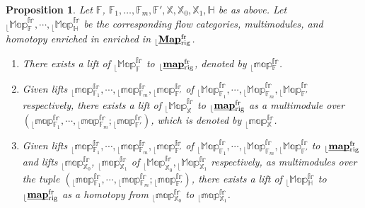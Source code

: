 \documentclass[reqno, 10pt]{amsart}
\numberwithin{equation}{section}
\numberwithin{equation}{section}
\newtheorem{prop}[thm]{Proposition}
\theoremstyle{definition}
\theoremstyle{remark}
\newcommand{\mb}{\mathbb}
\renewcommand{\outer}{{}_{\lfloor}}
\newcommand{\uds}[1]{\underline{\smash{#1}}}
\begin{document}
\begin{prop}\label{prop_group_reduction}
Let ${\mb F}$, ${\mb F}_1, \ldots, {\mb F}_m, {\mb F}', {\mb X}, {\mb X}_0, {\mb X}_1, {\mb H}$ be as above. Let $\outer \mb{Map}_{\mb F}^{\mb{fr}}, \cdots, \outer \mb{Map}_{{\mb H}}^{\mb{fr}}$ be the corresponding flow categories, multimodules, and homotopy enriched in enriched in $\outer \uds{\bf Map}^{\rm fr}_{\rm rig}$.
\begin{enumerate}

\item There exists a lift of $\outer \mb{Map}_{\mb F}^{\mb{fr}}$ to $\outer \uds{\bf map}^{\rm fr}_{\rm rig}$, denoted by $\outer \mb{map}{}_{\mb{F}}^{\mb{fr}}$.

\item Given lifts $\outer {\mb{map}}{}_{{\mb F}_1}^{\mb{fr}}, \cdots, \outer  {\mb{map}}{}_{\mb{F}_m}^{\mb{fr}}, \outer {\mb{map}}{}_{{\mb F}'}^{\mb{fr}}$ of $\outer \mb{Map}_{{\mb F}_1}^{\mb{fr}}, \cdots, \outer \mb{Map}_{{\mb F}_m}^{\mb{fr}}, \outer \mb{Map}_{\mb{F}'}^{\mb{fr}}$ respectively, there exists a lift of $\outer {\mb{Map}}_{\mb X}^{\mb{fr}}$ to $\outer \uds{\bf map}^{\rm fr}_{\rm rig}$ as a multimodule over $(\outer {\mb{map}}{}_{{\mb F}_1}^{\mb{fr}}, \cdots, \outer  {\mb{map}}{}_{\mb{F}_m}^{\mb{fr}}; \outer  {\mb{map}}{}_{{\mb F}'}^{\mb{fr}})$, which is denoted by $\outer {\mb{map}}{}_{{\mb X}}^{\mb{fr}}$.

\item Given lifts $\outer {\mb{map}}{}_{{\mb F}_1}^{\mb{fr}}, \cdots, \outer   {\mb{map}}{}_{\mb{F}_m}^{\mb{fr}}, \outer {\mb{map}}{}_{{\mb F}'}^{\mb{fr}}$ of $\outer \mb{Map}_{{\mb F}_1}^{\mb{fr}}, \cdots, \outer \mb{Map}_{{\mb F}_m}^{\mb{fr}}, \outer \mb{Map}_{\mb{F}'}^{\mb{fr}}$ to $\outer \uds{\bf map}^{\rm fr}_{\rm rig}$ and lifts $\outer { \mb{map}}{}_{{\mb X}_0}^{\mb{fr}}$, $\outer {\mb{map}}{}_{{\mb X}_1}^{\mb{fr}}$ of $\outer \mb{Map}_{\mb{X}_0}^{\mb{fr}}, \outer \mb{Map}{}_{{\mb X}_1}^{\mb{fr}}$ respectively, as multimodules over the tuple $(\outer {\mb{map}}{}_{{\mb F}_1}^{\mb{fr}}, \cdots, \outer {\mb{map}}{}_{\mb{F}_m}^{\mb{fr}}; \outer {\mb{map}}{}_{{\mb F}'}^{\mb{fr}})$, there exists a lift of $\outer \mb{Map}{}_{{\mb H}}^{\mb{fr}}$ to $\outer \uds{\bf map}^{\rm fr}_{\rm rig}$ as a homotopy from $\outer{ \mb{map}}{}_{{\mb X}_0}^{\mb{fr}}$ to $\outer {\mb{map}}{}_{{\mb X}_1}^{\mb{fr}}$.
\end{enumerate}
\end{prop}
\end{document}
